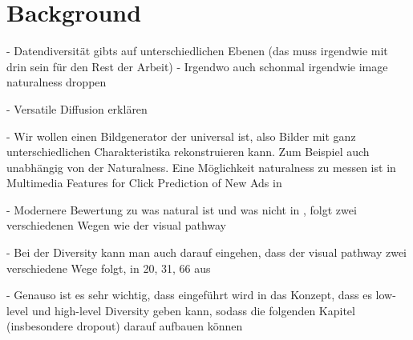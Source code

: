 \chapter{Background}


- Datendiversität gibts auf unterschiedlichen Ebenen (das muss irgendwie mit drin sein für den Rest der Arbeit)
- Irgendwo auch schonmal irgendwie image naturalness droppen



- Versatile Diffusion \cite{xuVersatileDiffusionText2024} erklären

- Wir wollen einen Bildgenerator der universal ist, also Bilder mit ganz unterschiedlichen Charakteristika rekonstruieren kann. Zum Beispiel auch unabhängig von der Naturalness. Eine Möglichkeit naturalness zu messen ist in Multimedia Features for Click Prediction of New Ads in

- Modernere Bewertung zu was natural ist und was nicht in \cite{chenExploringNaturalnessAIGenerated2023}, folgt zwei verschiedenen Wegen wie der visual pathway

- Bei der Diversity kann man auch darauf eingehen, dass der visual pathway zwei verschiedene Wege folgt, in 20, 31, 66 aus \cite{chenExploringNaturalnessAIGenerated2023}

    - Genauso ist es sehr wichtig, dass eingeführt wird in das Konzept, dass es low-level und high-level Diversity geben kann, sodass die folgenden Kapitel (insbesondere dropout) darauf aufbauen können